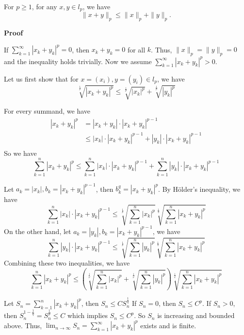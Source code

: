 \documentclass[main.tex]{subfiles}
\begin{document}
\begin{theorem}
    For $p \ge 1$, for any $x, y \in l_p$, we have \[ \|x + y\|_p \le \|x\|_p + \|y\|_p. \]
\end{theorem}
\par \noindent \textbf{Proof}  
\par If $\sum_{k = 1}^{\infty} |x_k + y_k|^p = 0$, then $x_k + y_k = 0$ for all $k$. Thus, $\|x\|_p = \|y\|_p = 0$ and the inequality holds trivially. Now we assume $\sum_{k = 1}^{\infty} |x_k + y_k|^p > 0$. 
\par Let us first show that for $x = (x_i), y = (y_i) \in l_p$, we have \[ \sqrt[\frac{1}{p}]{|x_k + y_k|^p} \le \sqrt[\frac{1}{p}]{|x_k|^p} + \sqrt[\frac{1}{p}]{|y_k|^p} \] 
\par For every summand, we have 
\begin{align*}
    |x_k + y_k|^p & = |x_k + y_k| \cdot |x_k + y_k|^{p-1} \\
    & \le |x_k| \cdot |x_k + y_k|^{p-1} + |y_k| \cdot |x_k + y_k|^{p-1} \\
\end{align*}
So we have 
\begin{equation}
    \sum_{k=1}^{n} |x_k + y_k|^p \le \sum_{k=1}^{n} |x_k| \cdot |x_k + y_k|^{p-1} + \sum_{k=1}^{n} |y_k| \cdot |x_k + y_k|^{p-1}
\end{equation}
\par Let $a_k = |x_k|, b_k = |x_k + y_k|^{p-1}$, then $b_k^q = |x_k + y_k|^p$. By Hölder's inequality, we have 
\[
    \sum_{k=1}^{n} |x_k| \cdot |x_k + y_k|^{p-1} \le \sqrt[\frac{1}{p}]{\sum_{k=1}^{n} |x_k|^p} \sqrt[\frac{1}{q}]{\sum_{k=1}^{n} |x_k + y_k|^p}
\]
On the other hand, let $a_k = |y_k|, b_k = |x_k + y_k|^{p-1}$, we have
\[
    \sum_{k=1}^{n} |y_k| \cdot |x_k + y_k|^{p-1} \le \sqrt[\frac{1}{p}]{\sum_{k=1}^{n} |y_k|^p} \sqrt[\frac{1}{q}]{\sum_{k=1}^{n} |x_k + y_k|^p}
\]
Combining these two inequalities, we have
\begin{equation}
    \sum_{k=1}^{n} |x_k + y_k|^p \le \left( \sqrt[\frac{1}{p}]{\sum_{k=1}^{n} |x_k|^p} + \sqrt[\frac{1}{p}]{\sum_{k=1}^{n} |y_k|^p} \right) \sqrt[\frac{1}{q}]{\sum_{k=1}^{n} |x_k + y_k|^p}
\end{equation}
\par Let $S_n = \sum_{k = 1}^{n} |x_k + y_k|^p$, then $
    S_n \le C S_n^{\frac{1}{q}}$
If $S_n = 0$, then $S_n \le C^p$. If $S_n > 0$, then $S_n^{1 - \frac{1}{q}} = S_n^{\frac{1}{p}} \le C$ which implies $S_n \le C^p$. So $S_n$ is increasing and bounded above. Thus, $\lim_{n \to \infty} S_n = \sum_{k=1}^{\infty} |x_k + y_k|^p$ exists and is finite.
\end{document}

